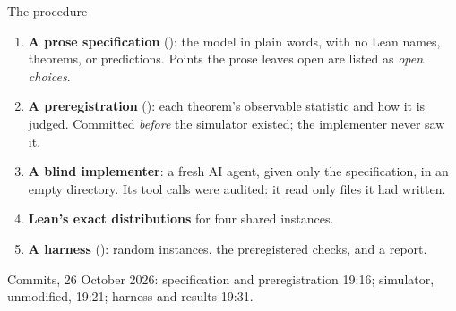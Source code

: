 \documentclass[aspectratio=169,11pt]{beamer}
\begin{document}
\begin{frame}{The procedure}
  \begin{enumerate}
    \item \textbf{A prose specification} (): the model in plain words, with no Lean names, theorems, or predictions. Points the prose leaves open are listed as \emph{open choices}.
    \item \textbf{A preregistration} (): each theorem's observable statistic and how it is judged. Committed \emph{before} the simulator existed; the implementer never saw it.
    \item \textbf{A blind implementer}: a fresh AI agent, given only the specification, in an empty directory. Its tool calls were audited: it read only files it had written.
    \item \textbf{Lean's exact distributions} for four shared instances.
    \item \textbf{A harness} (): random instances, the preregistered checks, and a report.
  \end{enumerate}
  \medskip
  \small Commits, 26 October 2026: specification and preregistration 19:16; simulator, unmodified, 19:21; harness and results 19:31.
\end{frame}
\end{document}
